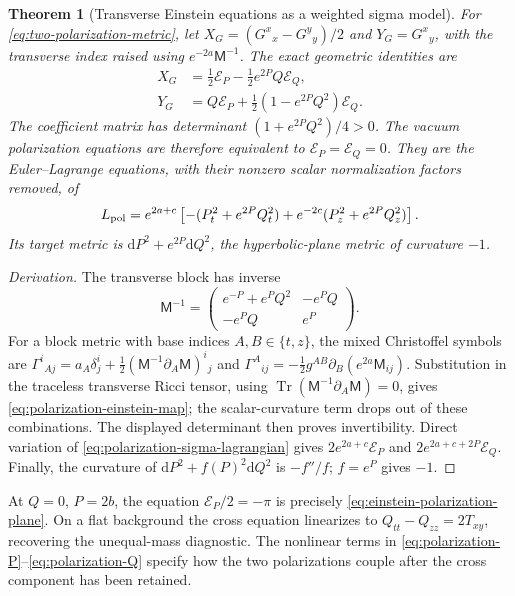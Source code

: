 \documentclass[11pt,a4paper,oneside]{book}
\theoremstyle{plain}
\newtheorem{theorem}{Theorem}[chapter]
\theoremstyle{definition}
\theoremstyle{remark}
\newcommand{\dd}{\mathrm d}
\newcommand{\Tr}{\operatorname{Tr}}
\newcommand{\src}[2]{\cite{#1}}
\begin{document}
\begin{theorem}[Transverse Einstein equations as a weighted sigma model]
\label{thm:polarization-sigma}
For \eqref{eq:two-polarization-metric}, let
$X_G=(G^x{}_x-G^y{}_y)/2$ and $Y_G=G^x{}_y$, with the transverse index
raised using $e^{-2a}\mathsf M^{-1}$.  The exact geometric identities are
\begin{equation}
 \begin{aligned}
 X_G&=\frac12\mathcal E_P-\frac12e^{2P}Q\mathcal E_Q,\\
 Y_G&=Q\mathcal E_P+\frac12(1-e^{2P}Q^2)\mathcal E_Q.
 \end{aligned}
 \label{eq:polarization-einstein-map}
\end{equation}
The coefficient matrix has determinant $(1+e^{2P}Q^2)/4>0$.
The vacuum polarization equations are therefore equivalent to
$\mathcal E_P=\mathcal E_Q=0$.  They are the Euler--Lagrange equations,
with their nonzero scalar normalization factors removed, of
\begin{equation}
 L_{\rm pol}=e^{2a+c}\left[
 -(P_t^2+e^{2P}Q_t^2)+e^{-2c}(P_z^2+e^{2P}Q_z^2)
 \right].
 \label{eq:polarization-sigma-lagrangian}
\end{equation}
Its target metric is $\dd P^2+e^{2P}\dd Q^2$, the hyperbolic-plane
metric of curvature $-1$.
\end{theorem}
\begin{proof}[Derivation]
The transverse block has inverse
\[
 \mathsf M^{-1}=
 \begin{pmatrix}e^{-P}+e^P Q^2&-e^P Q\\-e^P Q&e^P\end{pmatrix}.
\]
For a block metric with base indices $A,B\in\{t,z\}$, the mixed
Christoffel symbols are
$\Gamma^i{}_{Aj}=a_A\delta^i_j+\tfrac12(\mathsf M^{-1}\partial_A\mathsf M)^i{}_j$
and
$\Gamma^A{}_{ij}=-\tfrac12g^{AB}\partial_B(e^{2a}\mathsf M_{ij})$.
Substitution in the traceless transverse Ricci tensor, using
$\Tr(\mathsf M^{-1}\partial_A\mathsf M)=0$, gives
\eqref{eq:polarization-einstein-map}; the scalar-curvature term drops
out of these combinations.  The displayed determinant then proves
invertibility.  Direct variation of \eqref{eq:polarization-sigma-lagrangian}
gives $2e^{2a+c}\mathcal E_P$ and $2e^{2a+c+2P}\mathcal E_Q$.
Finally, the curvature of $\dd P^2+f(P)^2\dd Q^2$ is $-f''/f$;
$f=e^P$ gives $-1$.
\end{proof}
\src{R20}{thm:v20v38-metric,thm:v20v38-sigma,thm:v20v38-limits}

At $Q=0$, $P=2b$, the equation $\mathcal E_P/2=-\pi$ is precisely
\eqref{eq:einstein-polarization-plane}.  On a flat background the cross
equation linearizes to $Q_{tt}-Q_{zz}=2T_{xy}$, recovering the
unequal-mass diagnostic.  The nonlinear terms in
\eqref{eq:polarization-P}--\eqref{eq:polarization-Q} specify how the two
polarizations couple after the cross component has been retained.
\end{document}
